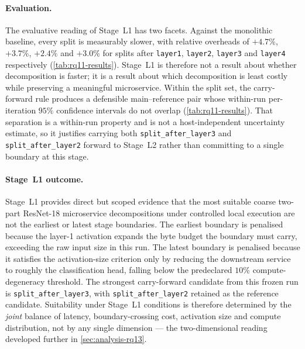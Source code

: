 \paragraph{Evaluation.}
The evaluative reading of Stage~L1 has two facets. Against the
monolithic baseline, every split is measurably slower, with relative
overheads of \(+4.7\%\), \(+3.7\%\), \(+2.4\%\) and \(+3.0\%\) for
splits after \texttt{layer1}, \texttt{layer2}, \texttt{layer3} and
\texttt{layer4} respectively (\cref{tab:rq11-results}). Stage~L1 is
therefore not a result about whether decomposition is faster; it is a
result about which decomposition is least costly while preserving a
meaningful microservice. Within the split set, the carry-forward rule
produces a defensible main--reference pair whose within-run per-iteration
\(95\%\) confidence intervals do not overlap
(\cref{tab:rq11-results}). That separation is a within-run property
and is not a host-independent uncertainty estimate, so it justifies
carrying both \texttt{split\_after\_layer3} and
\texttt{split\_after\_layer2} forward to Stage~L2 rather than committing
to a single boundary at this stage.

\paragraph{Stage~L1 outcome.}
Stage~L1 provides direct but scoped evidence that the most suitable
coarse two-part ResNet-18 microservice decompositions under controlled
local execution are not the earliest or latest stage boundaries. The
earliest boundary is penalised because the layer-1 activation expands
the byte budget the boundary must carry, exceeding the raw input size
in this run. The latest boundary is penalised because it satisfies
the activation-size criterion only by reducing the downstream service
to roughly the classification head, falling below the predeclared
\(10\%\) compute-degeneracy threshold. The strongest carry-forward
candidate from this frozen run is \texttt{split\_after\_layer3}, with
\texttt{split\_after\_layer2} retained as the reference candidate.
Suitability under Stage~L1 conditions is therefore determined by the
\emph{joint} balance of latency, boundary-crossing cost, activation
size and compute distribution, not by any single dimension --- the
two-dimensional reading developed further in
\cref{sec:analysis-rq13}.
